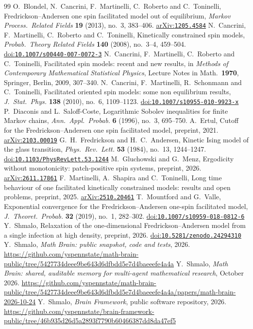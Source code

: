 \documentclass[11pt]{amsart}
\theoremstyle{definition}
\theoremstyle{remark}
\newcommand{\doi}[1]{\href{https://doi.org/#1}{doi:\nolinkurl{#1}}}
\newcommand{\arxiv}[1]{\href{https://arxiv.org/abs/#1}{arXiv:\nolinkurl{#1}}}
\begin{document}
\begin{thebibliography}{99}
 O.~Blondel, N.~Cancrini, F.~Martinelli, C.~Roberto and C.~Toninelli, Fredrickson--Andersen one spin
facilitated model out of equilibrium, \emph{Markov Process.\ Related Fields} \textbf{19} (2013), no.~3, 383--406.
\arxiv{1205.4584}
 N.~Cancrini, F.~Martinelli, C.~Roberto and C.~Toninelli, Kinetically constrained spin models,
\emph{Probab.\ Theory Related Fields} \textbf{140} (2008), no.~3--4, 459--504. \doi{10.1007/s00440-007-0072-3}
 N.~Cancrini, F.~Martinelli, C.~Roberto and C.~Toninelli, Facilitated spin models: recent and new
results, in \emph{Methods of Contemporary Mathematical Statistical Physics}, Lecture Notes in Math.\ \textbf{1970},
Springer, Berlin, 2009, 307--340.
 N.~Cancrini, F.~Martinelli, R.~Schonmann and C.~Toninelli, Facilitated oriented spin models: some
non equilibrium results, \emph{J.\ Stat.\ Phys.} \textbf{138} (2010), no.~6, 1109--1123.
\doi{10.1007/s10955-010-9923-x}
 P.~Diaconis and L.~Saloff-Coste, Logarithmic Sobolev inequalities for finite Markov chains, \emph{Ann.\
Appl.\ Probab.} \textbf{6} (1996), no.~3, 695--750.
 A.~Ertul, Cutoff for the Fredrickson--Andersen one spin facilitated model, preprint, 2021.
\arxiv{2103.00019}
 G.~H.~Fredrickson and H.~C.~Andersen, Kinetic Ising model of the glass transition, \emph{Phys.\ Rev.\
Lett.} \textbf{53} (1984), no.~13, 1244--1247. \doi{10.1103/PhysRevLett.53.1244}
\bibitem{GM26} M.~Gluchowski and G.~Menz, Ergodicity without monotonicity: patch-positive spin systems, preprint, 2026.
\arxiv{2611.17861}
\bibitem{MST25} F.~Martinelli, A.~Shapira and C.~Toninelli, Long time behaviour of one facilitated kinetically
constrained models: results and open problems, preprint, 2025. \arxiv{2510.20461}
\bibitem{MV19} T.~Mountford and G.~Valle, Exponential convergence for the Fredrickson--Andersen one-spin facilitated
model, \emph{J.\ Theoret.\ Probab.} \textbf{32} (2019), no.~1, 282--302. \doi{10.1007/s10959-018-0812-6}
\bibitem{Shm26} Y.~Shmalo, Relaxation of the one-dimensional Fredrickson--Andersen model from a single infection at high
density, preprint, 2026. \doi{10.5281/zenodo.24294310}
\bibitem{MathBrainRepo} Y.~Shmalo, \emph{Math Brain: public snapshot, code and tests}, 2026.
\url{https://github.com/yspennstate/math-brain-public/tree/5427734deee9be643d6dfbdd5e7d4baeeefe4a4a}
\bibitem{MathBrainPaper} Y.~Shmalo, \emph{Math Brain: shared, auditable memory for multi-agent mathematical research},
October 2026.
\url{https://github.com/yspennstate/math-brain-public/tree/5427734deee9be643d6dfbdd5e7d4baeeefe4a4a/papers/math-brain-2026-10-24}
 Y.~Shmalo, \emph{Brain Framework}, public software repository, 2026.
\url{https://github.com/yspennstate/brain-framework-public/tree/46b935d26d5a2893f7790b60466387dd8da47ef5}
\end{thebibliography}
\end{document}
